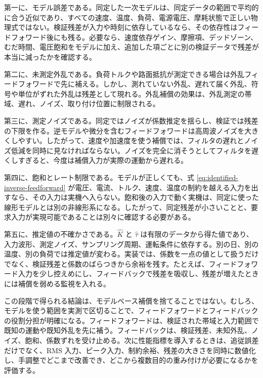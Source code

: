 第一に、モデル誤差である。同定した一次モデルは、同定データの範囲で平均的に合う近似であり、すべての速度、温度、負荷、電源電圧、摩耗状態で正しい物理式ではない。検証残差が入力や時刻に依存しているなら、その依存性はフィードフォワード後にも残る。必要なら、速度依存ゲイン、摩擦項、デッドゾーン、むだ時間、電圧飽和をモデルに加え、追加した項ごとに別の検証データで残差が本当に減ったかを確認する。

第二に、未測定外乱である。負荷トルクや路面抵抗が測定できる場合は外乱フィードフォワードで先に補える。しかし、測れていない外乱、遅れて届く外乱、符号や単位がずれた外乱は残差として現れる。外乱補償の効果は、外乱測定の帯域、遅れ、ノイズ、取り付け位置に制限される。

第三に、測定ノイズである。同定ではノイズが係数推定を揺らし、検証では残差の下限を作る。逆モデルや微分を含むフィードフォワードは高周波ノイズを大きくしやすい。したがって、速度や加速度を使う補償では、フィルタの遅れとノイズ低減を同時に見なければならない。ノイズを完全に消そうとしてフィルタを遅くしすぎると、今度は補償入力が実際の運動から遅れる。

第四に、飽和とレート制限である。モデルが正しくても、式 \eqref{eq:identified-inverse-feedforward} が電圧、電流、トルク、速度、温度の制約を越える入力を出すなら、その入力は実機へ入らない。飽和後の入力で動く実機は、同定に使った線形モデルとは別の非線形系になる。したがって、同定残差が小さいことと、要求入力が実現可能であることは別々に確認する必要がある。

第五に、推定値の不確かさである。$\hat{K}$ と $\hat{\tau}$ は有限のデータから得た値であり、入力波形、測定ノイズ、サンプリング周期、運転条件に依存する。別の日、別の温度、別の負荷では推定値が変わる。実装では、係数を一点の値として扱うだけでなく、検証残差と係数のばらつきから余裕を残す。たとえば、フィードフォワード入力を少し控えめにし、フィードバックで残差を吸収し、残差が増えたときには補償を弱める監視を入れる。

この段階で得られる結論は、モデルベース補償を捨てることではない。むしろ、モデルを使う範囲を実測で区切ることで、フィードフォワードとフィードバックの役割分担が明確になる。フィードフォワードは、検証された帯域と入力範囲で既知の運動や既知外乱を先に補う。フィードバックは、検証残差、未知外乱、ノイズ、飽和、係数ずれを受け止める。次に性能指標を導入するときは、追従誤差だけでなく、RMS 入力、ピーク入力、制約余裕、残差の大きさを同時に数値化し、手調整でどこまで改善でき、どこから複数目的の重み付けが必要になるかを評価する。
